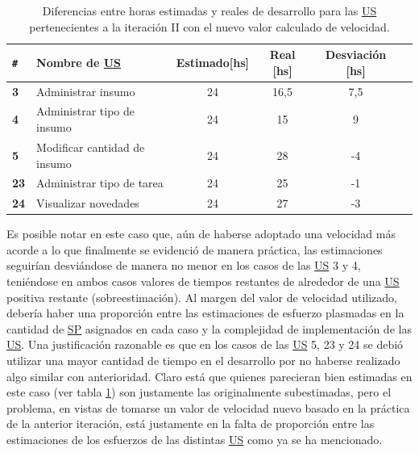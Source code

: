 \documentclass[a4paper, 12pt,twoside]{report}  %
\numberwithin{equation}{subsection} %
\begin{document}
\begin{table}[h!]
	\centering
	\captionsetup{justification=centering,margin=1.5cm}
	\begin{tabular}{ |p{0.5cm}|l|c|c|c|c| }
		\hline
		\verb|#|& \textbf{Nombre de \hyperlink{US}{US}}& \textbf{Estimado[hs]} & \textbf{Real [hs]} & \textbf{Desviación [hs]} \\
		\hline
		\textbf{3} & Administrar insumo & 24 & 16,5 & \cellcolor{diferencia_estimacion_positiva}7,5 \\
		\hline
		\textbf{4} & Administrar tipo de insumo & 24 & 15 & \cellcolor{diferencia_estimacion_positiva}9 \\
		\hline
		\textbf{5} & Modificar cantidad de insumo & 24 & 28 & \cellcolor{diferencia_estimacion_negativa}-4 \\
		\hline
		\textbf{23} & Administrar tipo de tarea & 24 & 25 & \cellcolor{diferencia_estimacion_negativa}-1 \\
		\hline
		\textbf{24} & Visualizar novedades & 24 & 27 & \cellcolor{diferencia_estimacion_negativa}-3 \\
		\hline
	\end{tabular}
	\caption{Diferencias entre horas estimadas y reales de desarrollo para las \protect\hyperlink{US}{US} pertenecientes a la iteración II con el nuevo valor calculado de velocidad.}
	\label{tabla_dif_horas_estim_iter_2}
\end{table}

\indent Es posible notar en este caso que, aún de haberse adoptado una velocidad más acorde a lo que finalmente se evidenció de manera práctica, las estimaciones seguirían desviándose de manera no menor en los casos de las \hyperlink{US}{US} 3 y 4, teniéndose en ambos casos valores de tiempos restantes de alrededor de una \hyperlink{US}{US} positiva restante (sobreestimación). Al margen del valor de velocidad utilizado, debería haber una proporción entre las estimaciones de esfuerzo plasmadas en la cantidad de \hyperlink{SP}{SP} asignados en cada caso y la complejidad de implementación de las \hyperlink{US}{US}. Una justificación razonable es que en los casos de las \hyperlink{US}{US} 5, 23 y 24 se debió utilizar una mayor cantidad de tiempo en el desarrollo por no haberse realizado algo similar con anterioridad. Claro está que quienes parecieran bien estimadas en este caso (ver tabla \ref{tabla_dif_horas_estim_iter_2}) son justamente las originalmente subestimadas, pero el problema, en vistas de tomarse un valor de velocidad nuevo basado en la práctica de la anterior iteración, está justamente en la falta de proporción entre las estimaciones de los  esfuerzos de las distintas \hyperlink{US}{US} como ya se ha mencionado.
\end{document}
